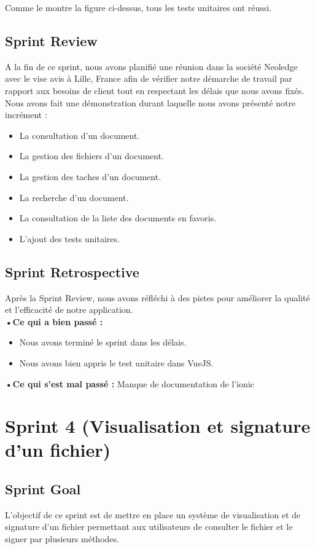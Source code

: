 Comme le montre la figure ci-dessus, tous les tests unitaires ont réussi.


\subsection{Sprint Review}
A la fin de ce sprint, nous avons planifié une réunion dans la société Neoledge avec le vise avis à Lille, France afin de vérifier notre démarche de travail par rapport aux besoins de client  tout en respectant les délais que nous avons fixés.
Nous avons fait une démonstration durant laquelle nous avons présenté notre incrément :
\begin{itemize}
  \item La consultation d'un document.
  \item La gestion des fichiers d'un document.
  \item La gestion des taches d'un document.
  \item La recherche d'un document.
  \item La consultation de la liste des documents en favoris.
  \item L'ajout des tests unitaires.
\end{itemize}

\subsection{Sprint Retrospective}

Après la Sprint Review, nous avons réfléchi à des pistes pour améliorer la qualité et l'efficacité de notre application.\\
\noindent\textbf{•Ce qui a bien passé :}
\begin{itemize}
  \item Nous avons terminé le sprint dans les délais.
  \item Nous avons bien appris le test unitaire dans VueJS.
\end{itemize}
\noindent\textbf{•Ce qui s'est mal passé :}
Manque de documentation de l'ionic 


\section{Sprint 4 (Visualisation et signature d'un fichier)}
\subsection{Sprint Goal}
L'objectif de ce sprint est de mettre en place un système de visualisation et de signature d'un fichier permettant aux utilisateurs de consulter le fichier et le signer par plusieurs méthodes.


